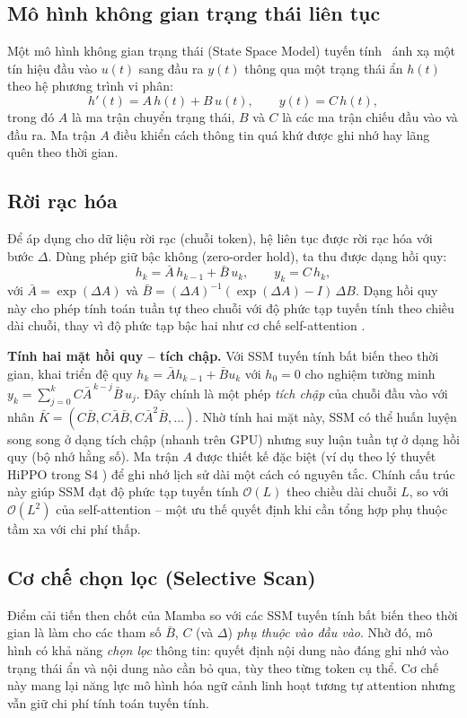 \subsection{Mô hình không gian trạng thái liên tục}
Một mô hình không gian trạng thái (State Space Model) tuyến tính~\cite{gu2022s4} ánh xạ một tín hiệu đầu vào $u(t)$ sang đầu ra $y(t)$ thông qua một trạng thái ẩn $h(t)$ theo hệ phương trình vi phân:
\begin{equation}
    h'(t) = A\, h(t) + B\, u(t), \qquad y(t) = C\, h(t),
\end{equation}
trong đó $A$ là ma trận chuyển trạng thái, $B$ và $C$ là các ma trận chiếu đầu vào và đầu ra. Ma trận $A$ điều khiển cách thông tin quá khứ được ghi nhớ hay lãng quên theo thời gian.

\subsection{Rời rạc hóa}
Để áp dụng cho dữ liệu rời rạc (chuỗi token), hệ liên tục được rời rạc hóa với bước $\Delta$. Dùng phép giữ bậc không (zero-order hold), ta thu được dạng hồi quy:
\begin{equation}
    h_k = \bar{A}\, h_{k-1} + \bar{B}\, u_k, \qquad y_k = C\, h_k,
\end{equation}
với $\bar{A} = \exp(\Delta A)$ và $\bar{B} = (\Delta A)^{-1}(\exp(\Delta A) - I)\,\Delta B$. Dạng hồi quy này cho phép tính toán tuần tự theo chuỗi với độ phức tạp tuyến tính theo chiều dài chuỗi, thay vì độ phức tạp bậc hai như cơ chế self-attention \cite{gu2022s4}.

\noindent\textbf{Tính hai mặt hồi quy -- tích chập.} Với SSM tuyến tính bất biến theo thời gian, khai triển đệ quy $h_k = \bar{A}h_{k-1}+\bar{B}u_k$ với $h_0=0$ cho nghiệm tường minh $y_k = \sum_{j=0}^{k} C\bar{A}^{\,k-j}\bar{B}\,u_j$. Đây chính là một phép \emph{tích chập} của chuỗi đầu vào với nhân $\bar{K}=(C\bar{B}, C\bar{A}\bar{B}, C\bar{A}^2\bar{B},\dots)$. Nhờ tính hai mặt này, SSM có thể huấn luyện song song ở dạng tích chập (nhanh trên GPU) nhưng suy luận tuần tự ở dạng hồi quy (bộ nhớ hằng số). Ma trận $A$ được thiết kế đặc biệt (ví dụ theo lý thuyết HiPPO trong S4 \cite{gu2022s4}) để ghi nhớ lịch sử dài một cách có nguyên tắc. Chính cấu trúc này giúp SSM đạt độ phức tạp tuyến tính $\mathcal{O}(L)$ theo chiều dài chuỗi $L$, so với $\mathcal{O}(L^2)$ của self-attention -- một ưu thế quyết định khi cần tổng hợp phụ thuộc tầm xa với chi phí thấp.

\subsection{Cơ chế chọn lọc (Selective Scan)}
Điểm cải tiến then chốt của Mamba \cite{gu2023mamba} so với các SSM tuyến tính bất biến theo thời gian là làm cho các tham số $\bar{B}$, $C$ (và $\Delta$) \emph{phụ thuộc vào đầu vào}. Nhờ đó, mô hình có khả năng \emph{chọn lọc} thông tin: quyết định nội dung nào đáng ghi nhớ vào trạng thái ẩn và nội dung nào cần bỏ qua, tùy theo từng token cụ thể. Cơ chế này mang lại năng lực mô hình hóa ngữ cảnh linh hoạt tương tự attention nhưng vẫn giữ chi phí tính toán tuyến tính.

